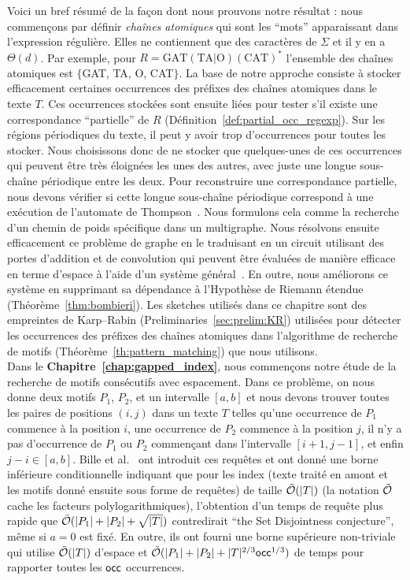Voici un bref résumé de la façon dont nous prouvons notre résultat : nous commençons par définir \emph{chaînes atomiques} qui sont les ``mots'' apparaissant dans l'expression régulière. Elles ne contiennent que des caractères de $\Sigma$ et il y en a $\Theta(d)$. Par exemple, pour $R= \mathrm{GAT}(\mathrm{TA} | \mathrm{O})(\mathrm{CAT})^*$ l'ensemble des chaînes atomiques est $\{$GAT, TA, O, CAT$\}$.
%
La base de notre approche consiste à stocker efficacement certaines occurrences des préfixes des chaînes atomiques dans le texte $T$. Ces occurrences stockées sont ensuite liées pour tester s'il existe une correspondance ``partielle'' de $R$ (Définition~\ref*{def:partial_occ_regexp}).
Sur les régions périodiques du texte, il peut y avoir trop d'occurrences pour toutes les stocker.
Nous choisissons donc de ne stocker que quelques-unes de ces occurrences qui peuvent être très éloignées les unes des autres, avec juste une longue sous-chaîne périodique entre les deux. Pour reconstruire une correspondance partielle, nous devons vérifier si cette longue sous-chaîne périodique correspond à une exécution de l'automate de Thompson~\cite{Thompson_automaton}. Nous formulons cela comme la recherche d'un chemin de poids spécifique dans un multigraphe. Nous résolvons ensuite efficacement ce problème de graphe en le traduisant en un circuit utilisant des portes d'addition et de convolution qui peuvent être évaluées de manière efficace en terme d'espace à l'aide d'un système général~\cite{LokshtanovN10,Bringmann17}. En outre, nous améliorons ce système en supprimant sa dépendance à l'Hypothèse de Riemann étendue (Théorème~\ref{thm:bombieri}). 
%
Les sketches utilisés dans ce chapitre sont des empreintes de Karp--Rabin (Preliminaries~\ref{sec:prelim:KR}) utilisées pour détecter les occurrences des préfixes des chaînes atomiques dans l'algorithme de recherche de motifs (Théorème~\ref{th:pattern_matching}) que nous utilisons.\\

Dans le \textbf{Chapitre~\ref{chap:gapped_index}}, nous commençons notre étude de la recherche de motifs consécutifs avec espacement. Dans ce problème, on nous donne deux motifs $P_1$, $P_2$, et un intervalle $[a,b]$ et nous devons trouver toutes les paires de positions $(i,j)$ dans un texte $T$ telles qu'une occurrence de $P_1$ commence à la position $i$, une occurrence de $P_2$ commence à la position $j$, il n'y a pas d'occurrence de $P_1$ ou $P_2$ commençant dans l'intervalle $[i+1,j-1]$, et enfin $j-i \in [a,b]$.
%
Bille et al.~\cite{bille2022gapped} ont introduit ces requêtes et ont donné une borne inférieure conditionnelle indiquant que pour les index (texte traité en amont et les motifs donné ensuite sous forme de requêtes) de taille $\tilde {\mathcal{O}}(|T|)$ (la notation $\tilde {\mathcal{O}}$ cache les facteurs polylogarithmiques), l'obtention d'un temps de requête plus rapide que $\tilde {\mathcal{O}}(|P_1|+|P_2|+\sqrt{|T|})$ contredirait ``the Set Disjointness conjecture'', même si $a=0$ est fixé. En outre, ils ont fourni une borne supérieure non-triviale qui utilise $\tilde {\mathcal{O}}(|T|)$ d'espace et $\tilde {\mathcal{O}} (|P_1| +|P_2| + |T|^{2/3}\mathsf{occ}^{1/3})$ de temps pour rapporter toutes les $\mathsf{occ}$ occurrences.

